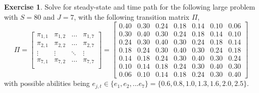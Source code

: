 \documentclass[letterpaper,12pt]{article}
\theoremstyle{definition}
\newtheorem{exercise}{Exercise} %
\numberwithin{equation}{section}
\numberwithin{exercise}{section}
\begin{document}
\begin{spacing}{1.5}
      \begin{exercise}\label{ExSperStochPi7}
         Solve for steady-state and time path for the following large problem with $S=80$ and $J=7$, with the following transition matrix $\Pi$,
         \begin{equation*}
            \Pi = \begin{bmatrix}
                     \pi_{1,1} & \pi_{1,2} & \hdots & \pi_{1,7} \\
                     \pi_{2,1} & \pi_{2,2} & \hdots & \pi_{2,7} \\
                     \vdots    & \vdots    & \ddots & \vdots    \\
                     \pi_{7,1} & \pi_{7,2} & \hdots & \pi_{7,7} \\
                  \end{bmatrix} =
                  \begin{bmatrix}
                     0.40 & 0.30 & 0.24 & 0.18 & 0.14 & 0.10 & 0.06 \\
                     0.30 & 0.40 & 0.30 & 0.24 & 0.18 & 0.14 & 0.10 \\
                     0.24 & 0.30 & 0.40 & 0.30 & 0.24 & 0.18 & 0.14 \\
                     0.18 & 0.24 & 0.30 & 0.40 & 0.30 & 0.24 & 0.18 \\
                     0.14 & 0.18 & 0.24 & 0.30 & 0.40 & 0.30 & 0.24 \\
                     0.10 & 0.14 & 0.18 & 0.24 & 0.30 & 0.40 & 0.30 \\
                     0.06 & 0.10 & 0.14 & 0.18 & 0.24 & 0.30 & 0.40
                  \end{bmatrix}
         \end{equation*}
         with possible abilities being $e_{j,t}\in\{e_1,e_2, ...e_7\}=\{0.6, 0.8, 1.0, 1.3, 1.6, 2.0, 2.5\}$.
      \end{exercise}



\end{spacing}
\end{document}
